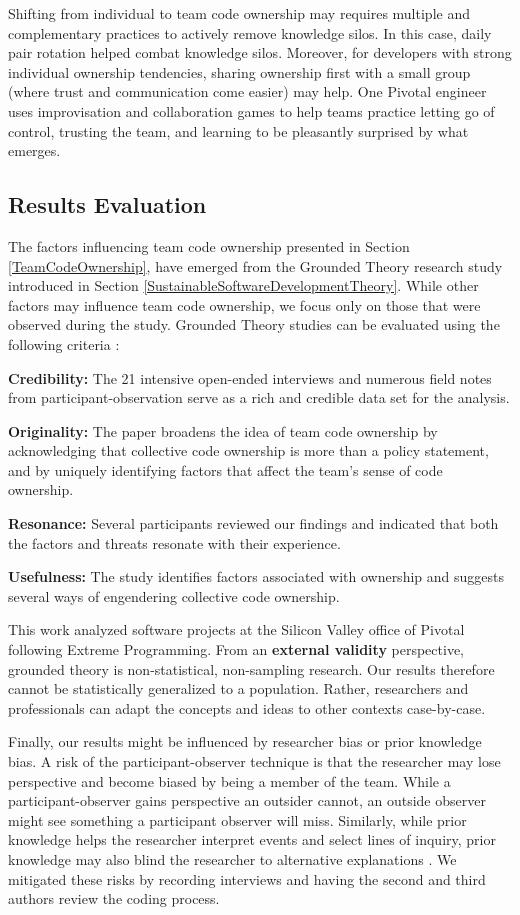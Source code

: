 Shifting from individual to team code ownership may requires multiple and complementary practices to actively remove knowledge silos. In this case, daily pair rotation helped combat knowledge silos. Moreover, for developers with strong individual ownership tendencies, sharing ownership first with a small group (where trust and communication come easier) may help. One Pivotal engineer uses improvisation and collaboration games to help teams practice letting go of control, trusting the team, and learning to be pleasantly surprised by what emerges. 

\subsection{Results Evaluation}

The factors influencing team code ownership presented in Section \ref{TeamCodeOwnership}, have emerged from the Grounded Theory research study introduced in Section \ref{SustainableSoftwareDevelopmentTheory}. While other factors may influence team code ownership, we focus only on those that were observed during the study. Grounded Theory studies can be evaluated using the following criteria \cite{Charmaz}: 

\textbf{Credibility:}  The 21 intensive open-ended interviews and numerous field notes from participant-observation serve as a rich and credible data set for the analysis. 

\textbf{Originality:} The paper broadens the idea of team code ownership by acknowledging that collective code ownership is more than a policy statement, and by uniquely identifying factors that affect the team's sense of code ownership.

\textbf{Resonance:} Several participants reviewed our findings and indicated that both the factors and threats resonate with their experience.

\textbf{Usefulness:} The study identifies factors associated with ownership and suggests several ways of engendering collective code ownership.

This work analyzed software projects at the Silicon Valley office of Pivotal following Extreme Programming. From an \textbf{external validity} perspective, grounded theory is non-statistical, non-sampling research. Our results therefore cannot be statistically generalized to a population. Rather, researchers and professionals can adapt the concepts and ideas to other contexts case-by-case. 

Finally, our results might be influenced by researcher bias or prior knowledge bias. A risk of the participant-observer technique is that the researcher may lose perspective and become biased by being a member of the team. While a participant-observer gains perspective an outsider cannot, an outside observer might see something a participant observer will miss. Similarly, while prior knowledge helps the researcher interpret events and select lines of inquiry, prior knowledge may also blind the researcher to alternative explanations \cite{GlaserIssues}. 
We mitigated these risks by recording interviews and having the second and third authors review the coding process. 

